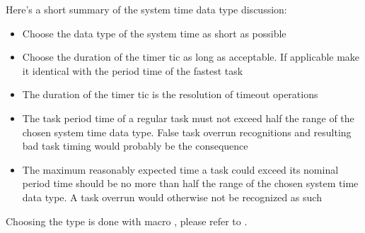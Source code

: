 Here's a short summary of the system time data type discussion:
\begin{itemize}
  \item Choose the data type of the system time as short as possible
  
  \item Choose the duration of the timer tic as long as acceptable. If
  applicable make it identical with the period time of the fastest task
  
  \item The duration of the timer tic is the resolution of timeout
  operations
  
  \item The task period time of a regular task must not exceed half the range
  of the chosen system time data type. False task overrun recognitions and
  resulting bad task timing would probably be the consequence

  \item The maximum reasonably expected time a task could exceed its nominal
  period time should be no more than half the range of the chosen system
  time data type. A task overrun would otherwise not be recognized as such
\end{itemize}
  
Choosing the type is done with macro
, please refer to .

